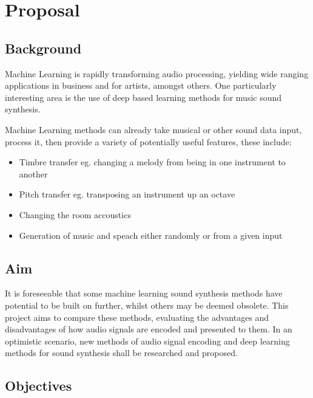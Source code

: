 \chapter{Proposal}

\label{ch:proposal}

\section{Background}

Machine Learning is rapidly transforming audio processing, yielding wide ranging
applications in business and for artists, amongst others. One particularly interesting
area is the use of deep based learning methods for music sound synthesis.

Machine Learning methods can already take musical or other sound data input, process
it, then provide a variety of potentially useful features, these include:
\begin{itemize}
    \item Timbre transfer eg. changing a melody from being in one instrument to
    another
    \item Pitch transfer eg. transposing an instrument up an octave
    \item Changing the room accoustics
    \item Generation of music and speach either randomly or from a given input
\end{itemize}

\section{Aim}

It is foreseeable that some machine learning sound synthesis methods have potential
to be built on further, whilst others may be deemed obsolete. This project aims
to compare these methods, evaluating the advantages and disadvantages of how audio
signals are encoded and presented to them. In an optimistic scenario, new methods
of audio signal encoding and deep learning methods for sound synthesis shall be
researched and proposed.

\section{Objectives}

